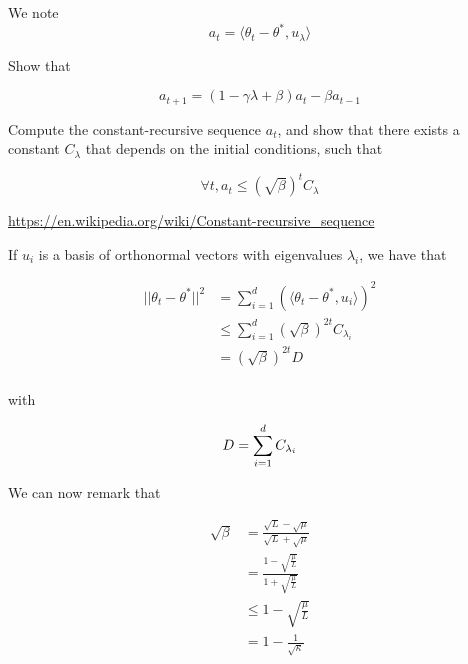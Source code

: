 \documentclass[
10pt, %
a4paper, %
oneside, %
headinclude,footinclude, %
BCOR5mm, %
]{scrartcl}
\begin{document}
We note
\begin{equation}
    a_t = \langle \theta_{t}- \theta^*, u_{\lambda} \rangle
\end{equation}

\exercice{} Show that 

\begin{equation}
    a_{t+1} = (1- \gamma \lambda +\beta) a_t- \beta a_{t-1}
\end{equation}

\exercice{\textbf{}} Compute the constant-recursive sequence $a_t$, and show
that there exists  a constant $C_{\lambda}$ that depends on the initial
conditions, such that

\begin{equation}
    \forall t, a_t\leq ( \sqrt{\beta} )^t C_{\lambda}
\end{equation}

\url{https://en.wikipedia.org/wiki/Constant-recursive_sequence} 

If $u_i$ is a basis of orthonormal vectors with eigenvalues $\lambda_i$, we have that

\begin{equation}
    \begin{aligned}
        \label{eq:}
	|| \theta_{t}-\theta^*||^2 &= \sum^{d}_{i=1}(\langle\theta_{t}-\theta^*, u_i \rangle)^2 \\
	&\leq \sum^{d}_{i=1} (\sqrt{\beta})^{2t} C_{\lambda_i}\\
	&= (\sqrt{\beta})^{2t} D\\
    \end{aligned}
\end{equation}

with 

\begin{equation}
    D = \sum^{d}_{i=1}  C_{\lambda_i}\\
\end{equation}

We can now remark that

\begin{equation}
    \begin{aligned}
        \label{eq:}
	\sqrt{\beta} &= \frac{ \sqrt{L} - \sqrt{\mu} }{ \sqrt{L} + \sqrt{\mu} } \\
	&=  \frac{1- \sqrt{ \frac{\mu}{L}}}{1+ \sqrt{ \frac{\mu}{L}}} \\
	&\leq 1- \sqrt{\frac{\mu}{L}}\\
	&= 1- \frac{1}{ \sqrt{\kappa} } 
    \end{aligned}
\end{equation}
\end{document}
